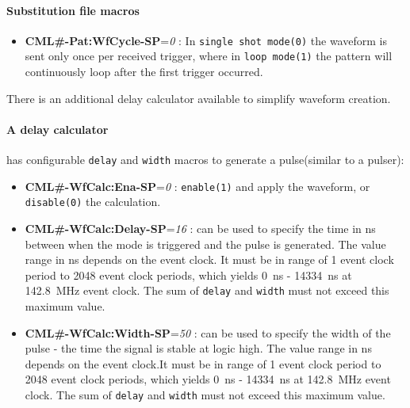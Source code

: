 \documentclass[12pt,a4paper]{article}
\begin{document}
\begin{itemize}
	\paragraph{Substitution file macros}
	\begin{itemize}
	\item
	  \textbf{CML\#-Pat:WfCycle-SP}=\emph{0} : In \texttt{single shot mode(0)} the
	  waveform is sent only once per received trigger, where in \texttt{loop mode(1)}
	  the pattern will continuously loop after the first trigger occurred.
	\end{itemize}
	
	There is an additional delay calculator available to simplify waveform creation. 
	\paragraph{A delay calculator} has configurable \texttt{delay} and \texttt{width} macros to generate a pulse(similar to a pulser):
	\begin{itemize}
	\item
	  \textbf{CML\#-WfCalc:Ena-SP}=\emph{0} : \texttt{enable(1)} and apply the waveform, or \texttt{disable(0)} the calculation.
	\item
	  \textbf{CML\#-WfCalc:Delay-SP}=\emph{16} : can be used to specify the time in ns between when the mode is triggered and the pulse is generated. The value range in ns depends on the event clock. It must be in range of 1 event clock period to 2048 event clock periods, which yields 0~ns - 14334~ns at 142.8~MHz event clock. The sum of \texttt{delay} and \texttt{width} must not exceed this maximum value.
	\item
	  \textbf{CML\#-WfCalc:Width-SP}=\emph{50} : can be used to specify the width of the pulse - the time the signal is stable at logic high. The value range in ns depends on the event clock.It must be in range of 1 event clock period to 2048 event clock periods, which yields 0~ns - 14334~ns at 142.8~MHz event clock. The sum of \texttt{delay} and \texttt{width} must not exceed this maximum value.
	\end{itemize}
	

\end{itemize}
\end{document}
